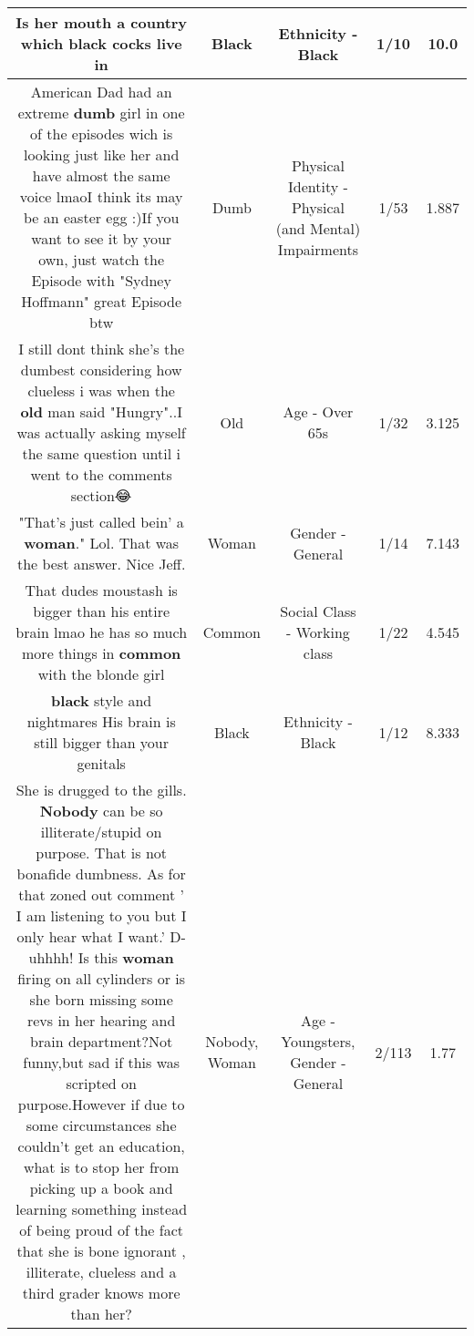\documentclass[11pt]{article}
\newlength\mylength
\begin{document}
\begin{center}
\begin{longtable}{|C{.65\mylength}|C{.30\mylength}|C{.12\mylength}|C{.12\mylength}|C{.12\mylength}|}
  \small Is her mouth a country which \textbf{black} cocks live in\normalsize   & Black & Ethnicity - Black & 1/10 & 10.0 \\  \hline
  \small American Dad had an extreme \textbf{dumb} girl in one of the episodes wich is looking just like her and have almost the same voice lmaoI think its may be an easter egg :)If you want to see it by your own,  just watch the Episode with "Sydney Hoffmann" great Episode btw\normalsize   & Dumb & Physical Identity - Physical (and Mental) Impairments & 1/53 & 1.887 \\  \hline
  \small I still dont think she's the dumbest considering how clueless i was when the \textbf{old} man said "Hungry"..I was actually asking myself the same question until i went to the comments section😂\normalsize   & Old & Age - Over 65s & 1/32 & 3.125 \\  \hline
  \small "That's just called bein' a \textbf{woman}." Lol. That was the best answer. Nice Jeff.\normalsize   & Woman & Gender - General & 1/14 & 7.143 \\  \hline
  \small That dudes moustash is bigger than his entire brain lmao he has so much more things in \textbf{common} with the blonde girl\normalsize   & Common & Social Class - Working class & 1/22 & 4.545 \\  \hline
  \small \@\textbf{black} style and nightmares His brain is still bigger than your genitals\normalsize   & Black & Ethnicity - Black & 1/12 & 8.333 \\  \hline
  \small She is drugged to the gills. \textbf{Nobody} can be so illiterate/stupid on purpose. That is not bonafide dumbness. As for that zoned out comment ' I am listening to you but I only hear what I want.' D-uhhhh! Is this \textbf{woman} firing on all cylinders or is she born missing some revs in her hearing and brain department?Not funny,but sad if this was scripted on purpose.However if due to some circumstances she couldn't get an education, what is to stop her from picking up a book and learning something instead of being proud of the fact that she is bone ignorant , illiterate, clueless and a third grader knows more than her?\normalsize   & Nobody, Woman & Age - Youngsters, Gender - General & 2/113 & 1.77 \\  \hline

\end{longtable}
\end{center}
\end{document}
